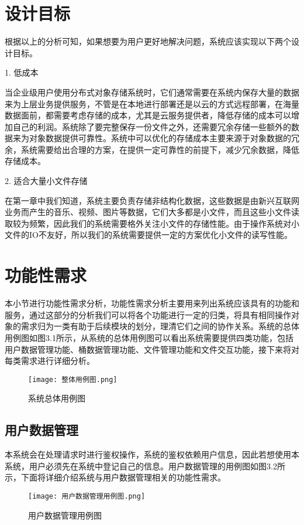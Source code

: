 \section{设计目标}
根据以上的分析可知，如果想要为用户更好地解决问题，系统应该实现以下两个设计目标。

1. 低成本

当企业级用户使用分布式对象存储系统时，它们通常需要在系统内保存大量的数据来为上层业务提供服务，不管是在本地进行部署还是以云的方式远程部署，在海量数据面前，都需要考虑存储的成本，尤其是云服务提供者，降低存储的成本可以增加自己的利润。系统除了要完整保存一份文件之外，还需要冗余存储一些额外的数据来为对象数据提供可靠性。系统中可以优化的存储成本主要来源于对象数据的冗余，系统需要给出合理的方案，在提供一定可靠性的前提下，减少冗余数据，降低存储成本。

2. 适合大量小文件存储

在第一章中我们知道，系统主要负责存储非结构化数据，这些数据是由新兴互联网业务而产生的音乐、视频、图片等数据，它们大多都是小文件，而且这些小文件读取较为频繁，因此我们的系统需要格外关注小文件的存储性能。由于操作系统对小文件的IO不友好，所以我们的系统需要提供一定的方案优化小文件的读写性能。

\section{功能性需求}%

本小节进行功能性需求分析，功能性需求分析主要用来列出系统应该具有的功能和服务，通过这部分的分析我们可以将各个功能进行一定的归类，将具有相同操作对象的需求归为一类有助于后续模块的划分，理清它们之间的协作关系。系统的总体用例图如图3.1所示，从系统的总体用例图可以看出系统需要提供四类功能，包括用户数据管理功能、桶数据管理功能、文件管理功能和文件交互功能，接下来将对每类需求进行详细分析。

\begin{figure}[h]
    \centering
    \texttt{[image: 整体用例图.png]}
    \caption{系统总体用例图}
\end{figure}

\subsection{用户数据管理}
本系统会在处理请求时进行鉴权操作，系统的鉴权依赖用户信息，因此若想使用本系统，用户必须先在系统中登记自己的信息。用户数据管理的用例图如图3.2所示，下面将详细介绍系统与用户数据管理相关的功能性需求。

\begin{figure}[h]
    \centering
    \texttt{[image: 用户数据管理用例图.png]}
    \caption{用户数据管理用例图}
\end{figure}

